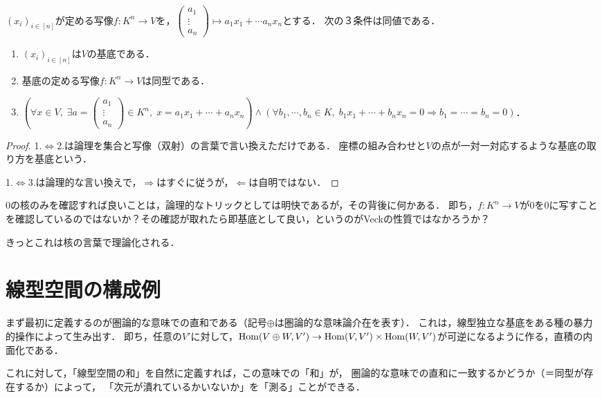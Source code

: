 \documentclass[uplatex, 12pt, dvipdfmx]{jsreport}
\begin{document}
\begin{proposition}[基底の特徴付け２]\label{prop-categorical-basis-old}
    $(x_i)_{i\in[n]}$が定める写像$f:K^n\to V$を，$\begin{pmatrix}a_1\\\vdots\\a_n\end{pmatrix}\mapsto a_1x_1+\cdots a_nx_n$とする．
    次の３条件は同値である．
    \begin{enumerate}
        \item $(x_i)_{i\in[n]}$は$V$の基底である．
        \item 基底の定める写像$f:K^n\to V$は同型である．
        \item $(\forall x\in V,\; \exists a=\begin{pmatrix}a_1\\\vdots\\a_n\end{pmatrix}\in K^n,\; x=a_1x_1+\cdots+a_nx_n)\land(\forall b_1,\cdots,b_n\in K,\; b_1x_1+\cdots+b_nx_n=0\Rightarrow b_1=\cdots=b_n=0)$．
    \end{enumerate}
\end{proposition}
\begin{proof}
    1.$\Leftrightarrow$2.は論理を集合と写像（双射）の言葉で言い換えただけである．
    座標の組み合わせと$V$の点が一対一対応するような基底の取り方を基底という．

    1.$\Leftrightarrow$3.は論理的な言い換えで，$\Rightarrow$はすぐに従うが，$\Leftarrow$は自明ではない．
\end{proof}
\begin{remark}
    $0$の核のみを確認すれば良いことは，論理的なトリックとしては明快であるが，その背後に何かある．
    即ち，$f:K^n\to V$が$0$を$0$に写すことを確認しているのではないか？その確認が取れたら即基底として良い，というのがVeckの性質ではなかろうか？

    きっとこれは核の言葉で理論化される．
\end{remark}

\section{線型空間の構成例}

\begin{screen}
    まず最初に定義するのが圏論的な意味での直和である（記号$\oplus$は圏論的な意味論介在を表す）．
    これは，線型独立な基底をある種の暴力的操作によって生み出す．
    即ち，任意の$V'$に対して，$\mathrm{Hom}(V\oplus W,V')\to\mathrm{Hom}(V,V')\times\mathrm{Hom}(W,V')$が可逆になるように作る，直積の内面化である．

    これに対して，「線型空間の和」を自然に定義すれば，この意味での「和」が，
    圏論的な意味での直和に一致するかどうか（＝同型が存在するか）によって，
    「次元が潰れているかいないか」を「測る」ことができる．
\end{screen}
\end{document}
